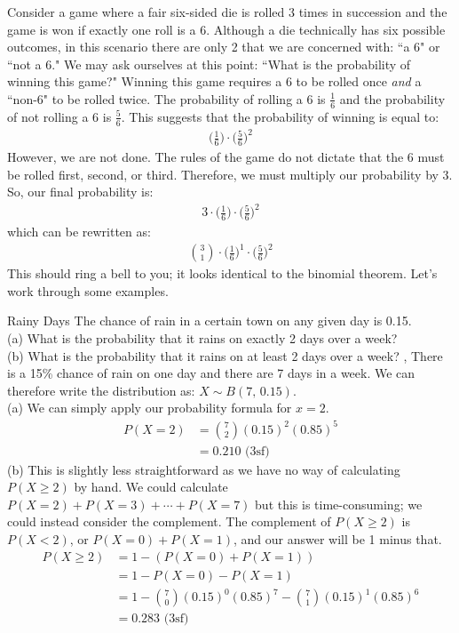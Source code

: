 \documentclass[../../main.tex]{subfiles}
\begin{document}
Consider a game where a fair six-sided die is rolled 3 times in succession and the game is won if exactly one roll is a 6. Although a die technically has six possible outcomes, in this scenario there are only 2 that we are concerned with: ``a 6" or ``not a 6." We may ask ourselves at this point: ``What is the probability of winning this game?" Winning this game requires a 6 to be rolled once \textit{and} a ``non-6" to be rolled twice. The probability of rolling a 6 is $\frac{1}6$ and the probability of not rolling a 6 is $\frac{5}6$. This suggests that the probability of winning is equal to:
\begin{align}
    \bigg(\frac{1}6\bigg) \cdot \bigg(\frac{5}6\bigg)^2
\end{align}
However, we are not done. The rules of the game do not dictate that the 6 must be rolled first, second, or third. Therefore, we must multiply our probability by 3. So, our final probability is:
\begin{align}
    3 \cdot \bigg(\frac{1}6\bigg) \cdot \bigg(\frac{5}6\bigg)^2
\end{align}
which can be rewritten as:
\begin{align}
    \binom{3}{1} \cdot  \bigg(\frac{1}6\bigg)^1 \cdot \bigg(\frac{5}6\bigg)^2
\end{align}
This should ring a bell to you; it looks identical to the binomial theorem. Let's work through some examples.
\begin{example}{Rainy Days}
The chance of rain in a certain town on any given day is 0.15. \\
(a) What is the probability that it rains on exactly 2 days over a week? \\
(b) What is the probability that it rains on at least 2 days over a week?
\sep
There is a 15\% chance of rain on one day and there are 7 days in a week. We can therefore write the distribution as: $X \sim B(7, \, 0.15)$. \\
(a) We can simply apply our probability formula for $x = 2$.
\begin{align}
    P(X=2) &= \binom{7}{2}(0.15)^2(0.85)^5 \\
    &= 0.210 \text{ (3sf)}
\end{align}
(b) This is slightly less straightforward as we have no way of calculating $P(X \geq 2)$ by hand. We could calculate $P(X=2) + P(X=3) + \cdots + P(X=7)$ but this is time-consuming; we could instead consider the complement. The complement of $P(X \geq 2)$ is $P(X < 2)$, or $P(X=0) + P(X=1)$, and our answer will be 1 minus that.
\begin{align}
    P(X \geq 2) &= 1 - (P(X=0) + P(X=1)) \\
    &= 1 - P(X=0) - P(X=1) \\
    &= 1 - \binom{7}{0}(0.15)^0(0.85)^7 - \binom{7}{1}(0.15)^1(0.85)^6 \\
    &= 0.283 \text{ (3sf)}
\end{align}
\end{example}
\end{document}
